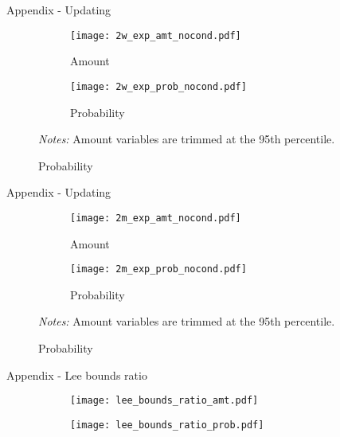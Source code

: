 \documentclass[8pt]{beamer}
\begin{document}
\begin{frame}{Appendix - Updating}
        \begin{figure}[H]
    \caption{Updating at 2 weeks}
    \label{update_exp2w}
    \begin{center}
        \begin{subfigure}{0.45\textwidth}
            \caption{Amount}
            \centering
            \texttt{[image: 2w\_exp\_amt\_nocond.pdf]}
        \end{subfigure}
        \begin{subfigure}{0.45\textwidth}
            \caption{Probability}
            \centering
            \texttt{[image: 2w\_exp\_prob\_nocond.pdf]}
        \end{subfigure}
      \end{center} 
         \scriptsize \textit{Notes:} Amount variables are trimmed at the 95th percentile.
\end{figure}      
        
\end{frame}


\begin{frame}{Appendix - Updating}
    \begin{figure}[H]
    \caption{Updating at 2 months}
    \label{update_exp2m}
    \begin{center}
            \begin{subfigure}{0.45\textwidth}
            \caption{Amount}
            \centering
            \texttt{[image: 2m\_exp\_amt\_nocond.pdf]}
        \end{subfigure}
        \begin{subfigure}{0.45\textwidth}
            \caption{Probability}
            \centering
            \texttt{[image: 2m\_exp\_prob\_nocond.pdf]}
        \end{subfigure}
    \end{center} 
         \scriptsize \textit{Notes:} Amount variables are trimmed at the 95th percentile.
\end{figure}

\end{frame}


\begin{frame}{Appendix - Lee bounds ratio}
\begin{figure}[H]
    \begin{center}
        \begin{subfigure}{0.49\textwidth}
            \centering
            \texttt{[image: lee\_bounds\_ratio\_amt.pdf]}
        \end{subfigure}
        \begin{subfigure}{0.49\textwidth}
                \centering
                \texttt{[image: lee\_bounds\_ratio\_prob.pdf]}
        \end{subfigure}
    \end{center} 
\end{figure} 
 
 
\end{frame}
\end{document}
